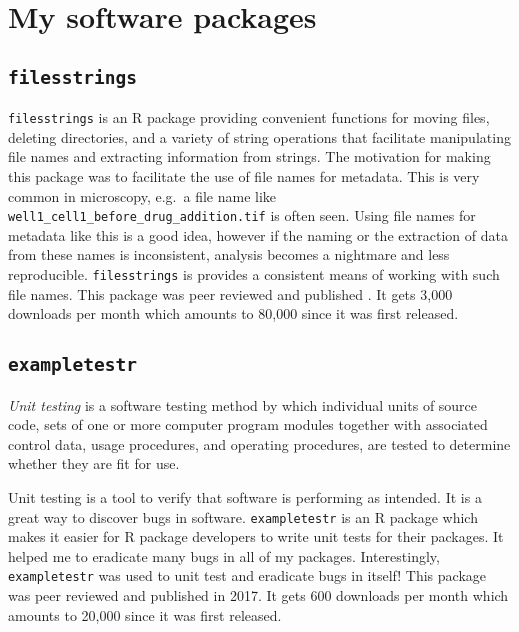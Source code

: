 \documentclass[12pt,]{book}
\theoremstyle{definition}
\theoremstyle{definition}
\theoremstyle{definition}
\theoremstyle{remark}
\let\BeginKnitrBlock\begin \let\EndKnitrBlock\end
\begin{document}
\section{My software packages}\label{my-software-packages}

\subsection{\texorpdfstring{\texttt{filesstrings}}{filesstrings}}\label{filesstrings}

\texttt{filesstrings} is an R package providing convenient functions for
moving files, deleting directories, and a variety of string operations
that facilitate manipulating file names and extracting information from
strings. The motivation for making this package was to facilitate the
use of file names for metadata. This is very common in microscopy,
e.g.~a file name like \texttt{well1\_cell1\_before\_drug\_addition.tif}
is often seen. Using file names for metadata like this is a good idea,
however if the naming or the extraction of data from these names is
inconsistent, analysis becomes a nightmare and less reproducible.
\texttt{filesstrings} is provides a consistent means of working with
such file names. This package was peer reviewed and published
\citep{filesstrings}. It gets 3,000 downloads per month which amounts to
80,000 since it was first released.

\subsection{\texorpdfstring{\texttt{exampletestr}}{exampletestr}}\label{exampletestr}

\BeginKnitrBlock{definition}
\protect\hypertarget{def:unnamed-chunk-29}{}{\label{def:unnamed-chunk-29}
}\emph{Unit testing} is a software testing method by which individual
units of source code, sets of one or more computer program modules
together with associated control data, usage procedures, and operating
procedures, are tested to determine whether they are fit for use.
\EndKnitrBlock{definition}

Unit testing is a tool to verify that software is performing as
intended. It is a great way to discover bugs in software.
\texttt{exampletestr} is an R package which makes it easier for R
package developers to write unit tests for their packages. It helped me
to eradicate many bugs in all of my packages. Interestingly,
\texttt{exampletestr} was used to unit test and eradicate bugs in
itself! This package was peer reviewed and published in
2017.\citep{exampletestr} It gets 600 downloads per month which amounts
to 20,000 since it was first released.
\end{document}
